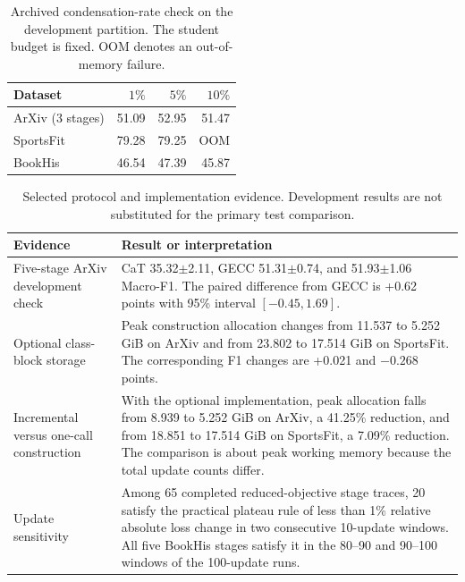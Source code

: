 

\begin{table}[H]
\centering
\scriptsize
\setlength{\tabcolsep}{3pt}
\caption{Archived condensation-rate check on the development partition.
The student budget is fixed. OOM denotes an out-of-memory failure.}
\label{tab:compact_rate}
\begin{tabular*}{\linewidth}{@{\extracolsep{\fill}}lrrr@{}}
\toprule
Dataset & $1\%$ & $5\%$ & $10\%$\\
\midrule
ArXiv (3 stages) & 51.09 & 52.95 & 51.47\\
SportsFit & 79.28 & 79.25 & OOM\\
BookHis & 46.54 & 47.39 & 45.87\\
\bottomrule
\end{tabular*}
\end{table}

\begin{table}[t]
\centering
\scriptsize
\setlength{\tabcolsep}{4pt}
\caption{Selected protocol and implementation evidence. Development results
are not substituted for the primary test comparison.}
\label{tab:compact_evidence}
\begin{tabular}{@{}p{}p{}@{}}
\toprule
Evidence & Result or interpretation \\
\midrule
Five-stage ArXiv development check & CaT 35.32$\pm$2.11, GECC 51.31$\pm$0.74, and \method{} 51.93$\pm$1.06 Macro-F1. The paired difference from GECC is +0.62 points with 95\% interval $[-0.45,1.69]$. \\
Optional class-block storage & Peak construction allocation changes from 11.537 to 5.252 GiB on ArXiv and from 23.802 to 17.514 GiB on SportsFit. The corresponding F1 changes are +0.021 and $-0.268$ points. \\
Incremental versus one-call construction & With the optional implementation, peak allocation falls from 8.939 to 5.252 GiB on ArXiv, a 41.25\% reduction, and from 18.851 to 17.514 GiB on SportsFit, a 7.09\% reduction. The comparison is about peak working memory because the total update counts differ. \\
Update sensitivity & Among 65 completed reduced-objective stage traces, 20 satisfy the practical plateau rule of less than 1\% relative absolute loss change in two consecutive 10-update windows. All five BookHis stages satisfy it in the 80--90 and 90--100 windows of the 100-update runs. \\
\bottomrule
\end{tabular}
\end{table}

